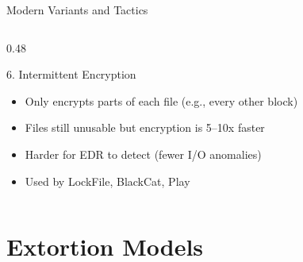 \documentclass[aspectratio=169]{beamer}
\begin{document}
\begin{frame}{Modern Variants and Tactics}
\begin{columns}[T]
\begin{column}{0.48\textwidth}
      \begin{block}{6. Intermittent Encryption}
        \footnotesize
        \begin{itemize}
          \item Only encrypts parts of each file (e.g., every other block)
          \item Files still unusable but encryption is 5--10x faster
          \item Harder for EDR to detect (fewer I/O anomalies)
          \item Used by LockFile, BlackCat, Play
        \end{itemize}
      \end{block}
    \end{column}
  \end{columns}
\end{frame}

\section{Extortion Models}
\end{document}
